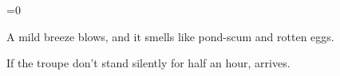 \ifnum\value{cycle}=0
\begin{boxtext}
  A mild breeze blows, and it smells like pond-scum and rotten eggs.
\end{boxtext}

If the troupe don't stand silently for half an hour,  arrives.

\basilisk

\fi
